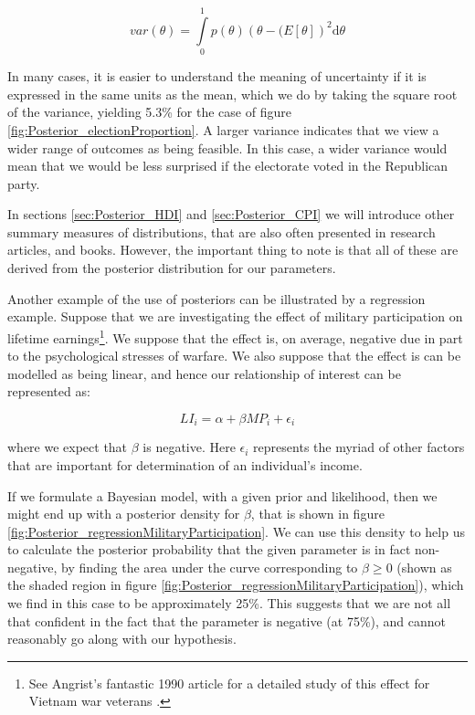 \documentclass[11pt,fullpage]{book}
\begin{document}
\begin{equation}
var(\theta)=  \int\limits_{0}^{1} p(\theta)(\theta-\mathbb(E[\theta])^2 \mathrm{d}\theta
\end{equation}

In many cases, it is easier to understand the meaning of uncertainty if it is expressed in the same units as the mean, which we do by taking the square root of the variance, yielding 5.3\% for the case of figure \ref{fig:Posterior_electionProportion}. A larger variance indicates that we view a wider range of outcomes as being feasible. In this case, a wider variance would mean that we would be less surprised if the electorate voted in the Republican party. 

In sections \ref{sec:Posterior_HDI} and \ref{sec:Posterior_CPI} we will introduce other summary measures of distributions, that are also often presented in research articles, and books. However, the important thing to note is that all of these are derived from the posterior distribution for our parameters. 

Another example of the use of posteriors can be illustrated by a regression example. Suppose that we are investigating the effect of military participation on lifetime earnings\footnote{See Angrist's fantastic 1990 article for a detailed study of this effect for Vietnam war veterans \cite{angrist1990lifetime}.}. We suppose that the effect is, on average, negative due in part to the psychological stresses of warfare. We also suppose that the effect is can be modelled as being linear, and hence our relationship of interest can be represented as:

\begin{equation}\label{eq:Posterior_militaryParticipation}
LI_i = \alpha + \beta MP_i + \epsilon_i
\end{equation}

where we expect that $\beta$ is negative. Here $\epsilon_i$ represents the myriad of other factors that are important for determination of an individual's income.

If we formulate a Bayesian model, with a given prior and likelihood, then we might end up with a posterior density for $\beta$, that is shown in figure \ref{fig:Posterior_regressionMilitaryParticipation}. We can use this density to help us to calculate the posterior probability that the given parameter is in fact non-negative, by finding the area under the curve corresponding to $\beta\geq 0$ (shown as the shaded region in figure \ref{fig:Posterior_regressionMilitaryParticipation}), which we find in this case to be approximately 25\%. This suggests that we are not all that confident in the fact that the parameter is negative (at 75\%), and cannot reasonably go along with our hypothesis.
\end{document}

